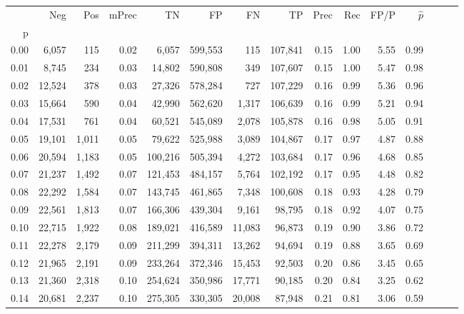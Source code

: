 \begin{tabular}{rrrrrrrrrrrrrrr}
\toprule
{} &     Neg &    Pos & mPrec &       TN &       FP &       FN &       TP &  Prec &   Rec &  FP/P & $\hat{p}$ \\
p    &         &        &       &          &          &          &          &       &       &       &           \\
\midrule
0.00 &   6,057 &    115 &  0.02 &    6,057 &  599,553 &      115 &  107,841 &  0.15 &  1.00 &  5.55 &      0.99 \\
0.01 &   8,745 &    234 &  0.03 &   14,802 &  590,808 &      349 &  107,607 &  0.15 &  1.00 &  5.47 &      0.98 \\
0.02 &  12,524 &    378 &  0.03 &   27,326 &  578,284 &      727 &  107,229 &  0.16 &  0.99 &  5.36 &      0.96 \\
0.03 &  15,664 &    590 &  0.04 &   42,990 &  562,620 &    1,317 &  106,639 &  0.16 &  0.99 &  5.21 &      0.94 \\
0.04 &  17,531 &    761 &  0.04 &   60,521 &  545,089 &    2,078 &  105,878 &  0.16 &  0.98 &  5.05 &      0.91 \\
0.05 &  19,101 &  1,011 &  0.05 &   79,622 &  525,988 &    3,089 &  104,867 &  0.17 &  0.97 &  4.87 &      0.88 \\
0.06 &  20,594 &  1,183 &  0.05 &  100,216 &  505,394 &    4,272 &  103,684 &  0.17 &  0.96 &  4.68 &      0.85 \\
0.07 &  21,237 &  1,492 &  0.07 &  121,453 &  484,157 &    5,764 &  102,192 &  0.17 &  0.95 &  4.48 &      0.82 \\
0.08 &  22,292 &  1,584 &  0.07 &  143,745 &  461,865 &    7,348 &  100,608 &  0.18 &  0.93 &  4.28 &      0.79 \\
0.09 &  22,561 &  1,813 &  0.07 &  166,306 &  439,304 &    9,161 &   98,795 &  0.18 &  0.92 &  4.07 &      0.75 \\
0.10 &  22,715 &  1,922 &  0.08 &  189,021 &  416,589 &   11,083 &   96,873 &  0.19 &  0.90 &  3.86 &      0.72 \\
0.11 &  22,278 &  2,179 &  0.09 &  211,299 &  394,311 &   13,262 &   94,694 &  0.19 &  0.88 &  3.65 &      0.69 \\
0.12 &  21,965 &  2,191 &  0.09 &  233,264 &  372,346 &   15,453 &   92,503 &  0.20 &  0.86 &  3.45 &      0.65 \\
0.13 &  21,360 &  2,318 &  0.10 &  254,624 &  350,986 &   17,771 &   90,185 &  0.20 &  0.84 &  3.25 &      0.62 \\
0.14 &  20,681 &  2,237 &  0.10 &  275,305 &  330,305 &   20,008 &   87,948 &  0.21 &  0.81 &  3.06 &      0.59 \\

\end{tabular}

